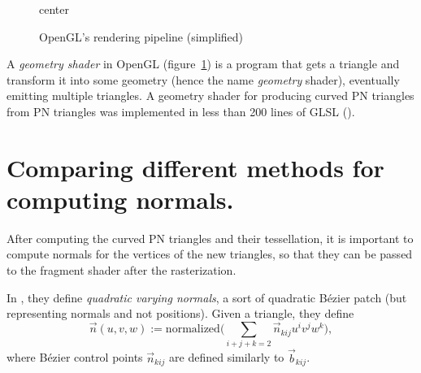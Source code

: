 \documentclass[fontsize=13pt,a4paper,DIV=15,parskip=half]{scrartcl}
\renewcommand{\texttt}[1]{\text{\normalfont\ttfamily#1}}
\theoremstyle{definition}
\newcommand\linkfile[1]{\href{https://gitlab.aliens-lyon.fr/hsalou/m1-cgdi-project/-/blob/master/#1}{\texttt{#1}}}
\begin{document}
  \begin{figure}[htbp]
    \centering
    \begin{adjustbox}{center}
    \end{adjustbox}
    \caption{\textsf{OpenGL}'s rendering pipeline (simplified)}
    \label{fig:opengl}
  \end{figure}

  A \textit{geometry shader} in \textsf{OpenGL} (figure~\ref{fig:opengl}) is a
  program that gets a triangle and transform it into some geometry (hence the
  name \textit{geometry} shader), eventually emitting multiple triangles. A
  geometry shader for producing curved PN triangles from PN triangles was
  implemented in less than 200 lines of GLSL (\linkfile{shaders/shader.geom}).

  \section{Comparing different methods for computing normals.}

  After computing the curved PN triangles and their tessellation, it is
  important to compute normals for the vertices of the new triangles, so that
  they can be passed to the fragment shader after the rasterization.

  In \cite{curvedpntriangles}, they define \textit{quadratic varying normals},
  a sort of quadratic Bézier patch (but representing normals and not
  positions). Given a triangle, they define
  \[
    \vec n(u, v, w) := \mathrm{normalized}\Big(\sum_{i+j+k = 2} \vec n_{kij} u^i v^j w^k\Big)
  ,\] 
  where Bézier control points $\vec n_{kij}$ are defined similarly to $\vec
  b_{kij}$.
\end{document}
